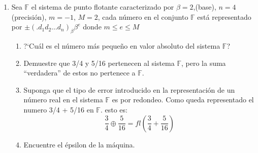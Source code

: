 \documentclass[12pt,letterpaper]{article}
\begin{document}
\begin{enumerate}
\item Sea $\mathbb{F}$ el sistema de punto flotante caracterizado por $\beta = 2$,(base), $n = 4$(precisi\'on), $m = -1$, $M = 2$, cada n\'umero en el conjunto $\mathbb{F}$ est\'a representado por $\pm(.d_1d_2 \ldots d_n)_{\beta}\beta^{e}$ donde $m \leq e \leq M$
\begin{enumerate}
 \item ?`Cu\'al es el n\'umero m\'as peque\~no en valor absoluto del sistema $\mathbb{F}$?
 \item Demuestre que 3/4 y 5/16 pertenecen al sistema $\mathbb{F}$, pero la suma ``verdadera'' de estos no pertenece a 
$\mathbb{F}$.
 \item Suponga que el tipo de error introducido en la representaci\'on de un n\'umero real en el sistema $\mathbb{F}$ es por redondeo. Como queda representado el numero 3/4 + 5/16 en $\mathbb{F}$. esto es:
 $$
 \frac{3}{4}\oplus\frac{5}{16} = fl(\frac{3}{4}+\frac{5}{16})
 $$
 \item Encuentre el \'epsilon de la m\'aquina.
\end{enumerate}

\end{enumerate}
\end{document}
